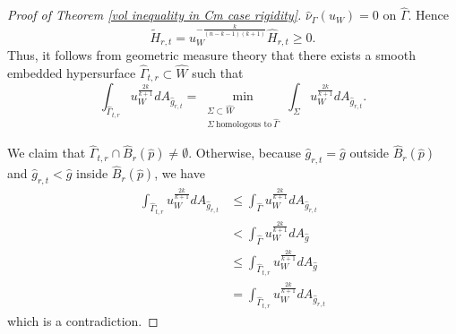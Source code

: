 \documentclass[11pt]{amsart}
\theoremstyle{definition}
\theoremstyle{remark}
\numberwithin{equation}{section}
\begin{document}
\begin{proof}[Proof of Theorem \ref{vol inequality in Cm case rigidity}]
          $\hat{\nu}_{\Gamma}(u_{W})=0$ on $\hat{\Gamma}$. Hence
        \[
            \tilde{H}_{r,t}
            =u_{W}^{-\frac{k}{(n-k-1)(k+1)}}\hat{H}_{r,t}\geq 0.
        \]
        Thus,
        it follows from geometric measure theory that there exists a smooth embedded hypersurface
          $\hat{\Gamma}_{t,r}\subset\hat{W}$ such that
        \[
            \int_{\hat{\Gamma}_{t,r}}u_{W}^{\frac{2k}{k+1}} dA_{\hat{g}_{r,t}} =
              \min_{\substack{ \Sigma\subset\hat{W}\\ \Sigma \ \text{homologous to}\
              \hat{\Gamma}
              }}\int_{\Sigma}u_{W}^{\frac{2k}{k+1}}dA_{\hat{g}_{r,t}}.
        \]
        
        We claim that $\hat{\Gamma}_{t,r}\cap \hat{B}_{r}(\hat{p})\neq \emptyset$. Otherwise, because
          $\hat{g}_{r,t}=\hat{g}$ outside $\hat{B}_{r}(\hat{p})$ and $\hat{g}_{r,t}<\hat{g}$ inside
          $\hat{B}_{r}(\hat{p})$, we have
        \begin{align*}
            \int_{\hat{\Gamma}_{t,r}}u_{W}^{\frac{2k}{k+1}} dA_{\hat{g}_{r,t}}&\leq
              \int_{\hat{\Gamma}}u_{W}^{\frac{2k}{k+1}}
              dA_{\hat{g}_{r,t}}\\&<\int_{\hat{\Gamma}}u_{W}^{\frac{2k}{k+1}} dA_{\hat{g}}\\
            &\leq\int_{\hat{\Gamma}_{t,r}}u_{W}^{\frac{2k}{k+1}} dA_{\hat{g}}\\
    &=\int_{\hat{\Gamma}_{t,r}}u_{W}^{\frac{2k}{k+1}}dA_{\hat{g}_{r,t}}
        \end{align*}
        which is a contradiction.
          

\end{proof}
\end{document}
